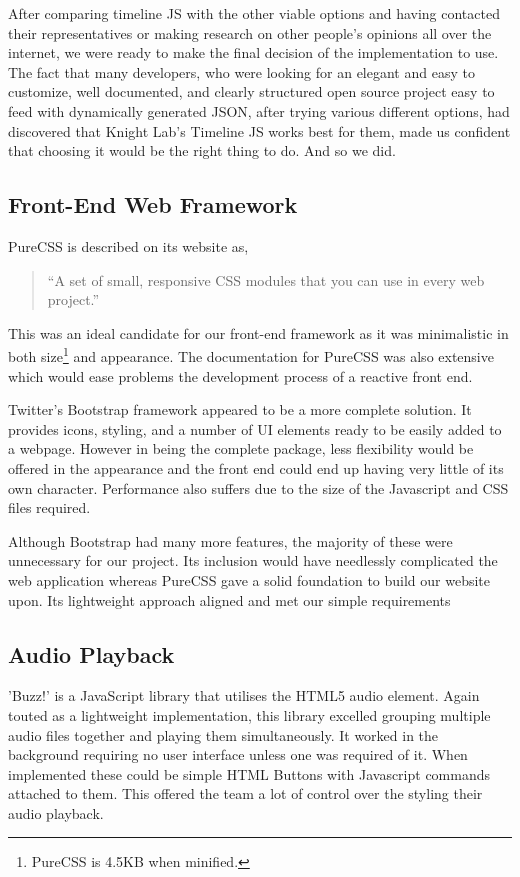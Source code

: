 \documentclass{l3proj}
\begin{document}
After comparing timeline JS with the other viable options and having contacted their representatives or making research on other people's opinions all over the internet, we were ready to make the final decision of the implementation to use. The fact that many developers, who were looking for an elegant and easy to customize, well documented, and clearly structured open source project easy to feed with dynamically generated JSON, after trying various different options, had discovered that Knight Lab’s Timeline JS works best for them, made us confident that choosing it would be the right thing to do. And so we did.



\subsection{Front-End Web Framework}

PureCSS is described on its website as,

\blockquote{“A set of small, responsive CSS modules that you can use in every web project.”}

This was an ideal candidate for our front-end framework as it was minimalistic in both size\footnote{PureCSS is 4.5KB when minified.} and appearance. The documentation for PureCSS was also extensive which would  ease problems the development process of a reactive front end.

Twitter's Bootstrap framework appeared to be a more complete solution. It provides icons, styling, and a number of UI elements ready to be easily added to a webpage. However in being the complete package, less flexibility would be offered in the appearance and the front end could end up having very little of its own character. Performance also suffers due to the size of the Javascript and CSS files required.

Although Bootstrap had many more features, the majority of these were unnecessary for our project. Its inclusion would have needlessly complicated the web application whereas PureCSS gave a solid foundation to build our website upon. Its lightweight approach aligned and met our simple requirements


\subsection{Audio Playback}

'Buzz!' is a JavaScript library that utilises the HTML5 audio element. Again touted as a lightweight implementation, this library excelled grouping multiple audio files together and playing them simultaneously. It worked in the background requiring no user interface unless one was required of it. When implemented these could be simple HTML Buttons with Javascript commands attached to them. This offered the team a lot of control over the styling their audio playback.
\end{document}
